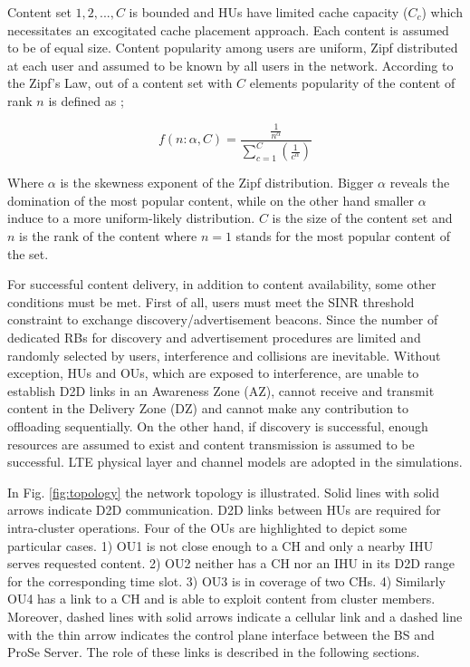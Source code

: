 \documentclass[10pt,a4paper,twocolumn]{article}
\begin{document}
Content set ${1,2,...,C}$ is bounded and HUs have limited cache capacity ($C_c$) which	necessitates an excogitated cache placement approach. Each content is assumed to be of equal size. Content popularity among users are uniform, Zipf distributed at each user and assumed to be known by all users in the network. According to the Zipf's Law, out of a content set with $C$ elements popularity of the content of rank $n$ is defined as \cite{ZipfDist};

\begin{equation}\label{eq:zipf}
	f(n:\alpha,C)=\frac{\frac{1}{n^{\alpha}}}{\sum_{c=1}^{C}(\frac{1}{c^{\alpha}})}
\end{equation}

Where $\alpha$ is the skewness exponent of the Zipf distribution. Bigger $\alpha$ reveals the domination of the most popular content, while on the other hand smaller $\alpha$ induce to a more uniform-likely distribution. $C$ is the size of the content set and $n$ is the rank of the content where $n=1$ stands for the most popular content of the set.

For successful content delivery, in addition to content availability, some other conditions must be met. First of all, users must meet the SINR threshold constraint to exchange discovery/advertisement beacons. Since the number of dedicated RBs for discovery and advertisement procedures are limited and randomly selected by users, interference and collisions are inevitable. Without exception, HUs and OUs, which are exposed to interference, are unable to establish D2D links in an Awareness Zone (AZ), cannot receive and transmit content in the Delivery Zone (DZ) and cannot make any contribution to offloading sequentially. On the other hand, if discovery is successful, enough resources are assumed to exist and content transmission is assumed to be successful. LTE physical layer and channel models \cite{KyostiWinner} are adopted in the simulations.

In Fig. \ref{fig:topology} the network topology is illustrated. Solid lines with solid arrows indicate D2D communication. D2D links between HUs are required for intra-cluster operations. Four of the OUs are highlighted to depict some particular cases. 1) OU1 is not close enough to a CH and only a nearby IHU serves requested content. 2) OU2 neither has a CH nor an IHU in its D2D range for the corresponding time slot. 3) OU3 is in coverage of two CHs. 4) Similarly OU4 has a link to a CH and is able to exploit content from cluster members. Moreover, dashed lines with solid arrows indicate a cellular link and a dashed line with the thin arrow indicates the control plane interface between the BS and ProSe Server. The role of these links is described in the following sections.
\end{document}
